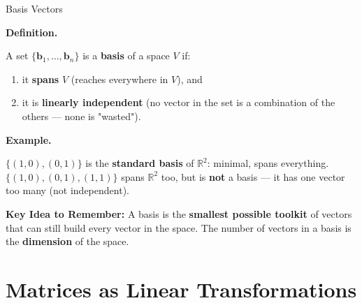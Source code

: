 \documentclass[9pt,aspectratio=169]{beamer}
\newcommand{\keyidea}[1]{%
\par\medskip\noindent\textbf{Key Idea to Remember:} #1\par\medskip}
\begin{document}
\begin{frame}{Basis Vectors}
\par\noindent\textbf{Definition.}\par
A set $\{\mathbf{b}_1,\dots,\mathbf{b}_n\}$ is a \textbf{basis} of a space $V$ if:
\begin{enumerate}
\item it \textbf{spans} $V$ (reaches everywhere in $V$), and
\item it is \textbf{linearly independent} (no vector in the set is a combination of the
others --- none is "wasted").
\end{enumerate}
\medskip


\par\noindent\textbf{Example.}\par
$\{(1,0),(0,1)\}$ is the \textbf{standard basis} of $\mathbb{R}^2$: minimal, spans
everything. $\{(1,0),(0,1),(1,1)\}$ spans $\mathbb{R}^2$ too, but is \textbf{not} a basis
--- it has one vector too many (not independent).
\medskip


\keyidea{A basis is the \textbf{smallest possible toolkit} of vectors that can still build
every vector in the space. The number of vectors in a basis is the \textbf{dimension} of
the space.}
\end{frame}

\section{Matrices as Linear Transformations}
\end{document}
